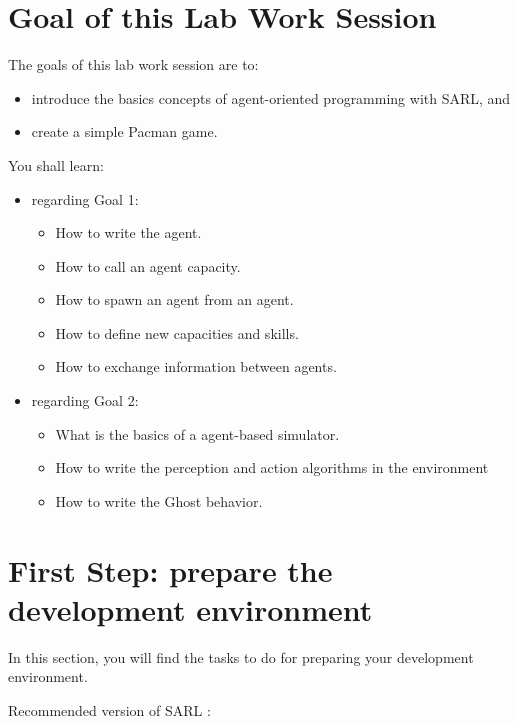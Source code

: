 \documentclass[article,english,nodocumentinfo]{multiagentfrreport}
\begin{document}
\section{Goal of this Lab Work Session}

The goals of this lab work session are to:
\begin{itemize}
\item introduce the basics concepts of agent-oriented programming with SARL, and
\item create a simple Pacman game.
\end{itemize}

You shall learn: 
\begin{itemize}
\item regarding Goal 1:
	\begin{itemize}
	\item How to write the agent.
	\item How to call an agent capacity.
	\item How to spawn an agent from an agent.
	\item How to define new capacities and skills.
	\item How to exchange information between agents.
	\end{itemize}
\item regarding Goal 2:
	\begin{itemize}
	\item What is the basics of a agent-based simulator.
	\item How to write the perception and action algorithms in the environment
	\item How to write the Ghost behavior.
	\end{itemize}
\end{itemize}

\section{First Step: prepare the development environment}

In this section, you will find the tasks to do for preparing your development environment.

\begin{emphbox}
Recommended version of SARL : \sarlversion
\end{emphbox}
\end{document}
